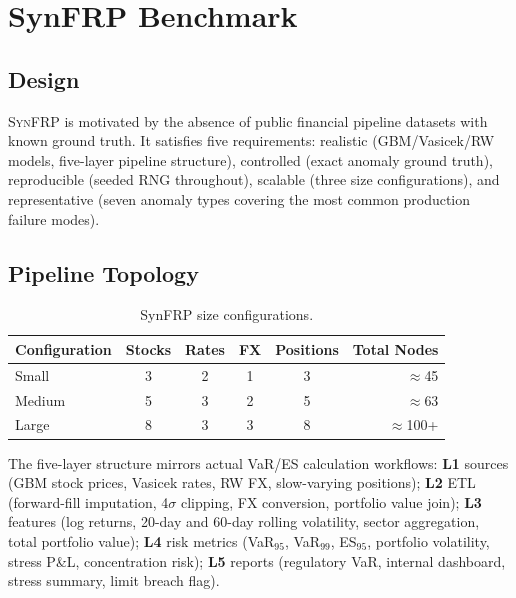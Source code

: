 \documentclass{article}
\newcommand{\synfrp}{\textsc{SynFRP}}
\begin{document}
\section{SynFRP Benchmark}
\label{sec:benchmark}

\subsection{Design}

\synfrp{} is motivated by the absence of public financial pipeline datasets
with known ground truth.
It satisfies five requirements: realistic (GBM/Vasicek/RW models, five-layer
pipeline structure), controlled (exact anomaly ground truth), reproducible
(seeded RNG throughout), scalable (three size configurations), and representative
(seven anomaly types covering the most common production failure modes).

\subsection{Pipeline Topology}

\begin{table}[h]
  \centering
  \caption{SynFRP size configurations.}
  \label{tab:sizes}
  \small
  \begin{tabular}{lccccr}
    \toprule
    Configuration & Stocks & Rates & FX & Positions & Total Nodes \\
    \midrule
    Small  & 3 & 2 & 1 & 3 & $\approx$45 \\
    Medium & 5 & 3 & 2 & 5 & $\approx$63 \\
    Large  & 8 & 3 & 3 & 8 & $\approx$100+ \\
    \bottomrule
  \end{tabular}
\end{table}

The five-layer structure mirrors actual VaR/ES calculation workflows:
\textbf{L1} sources (GBM stock prices, Vasicek rates, RW FX, slow-varying
positions); \textbf{L2} ETL (forward-fill imputation, 4$\sigma$ clipping, FX
conversion, portfolio value join); \textbf{L3} features (log returns, 20-day
and 60-day rolling volatility, sector aggregation, total portfolio value);
\textbf{L4} risk metrics (VaR$_{95}$, VaR$_{99}$, ES$_{95}$, portfolio
volatility, stress P\&L, concentration risk); \textbf{L5} reports (regulatory
VaR, internal dashboard, stress summary, limit breach flag).
\end{document}
